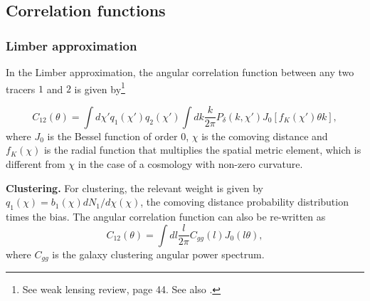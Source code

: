 \documentclass[\docopts]{\docclass}
\newcommand{\todo}[1]{\textcolor{magenta}{To do: #1}}
\newcommand{\mrm}[1]{\mathrm{#1}}
\begin{document}

\subsection{Correlation functions}
\label{sec:corr}

\subsubsection{Limber approximation}

In the Limber approximation, the angular correlation function between any two tracers $1$ and $2$ is given by\footnote{See \citet{Bartelmann01} weak lensing review, page 44. See also \citet{Joachimi10}.}

\begin{equation}
C_{12}(\theta) = \int d\chi'q_1(\chi')q_2(\chi')\int dk\frac{k}{2\pi}P_{\delta}(k,\chi')J_0[f_K(\chi')\theta k],
\end{equation}
%
where $J_0$ is the Bessel function of order 0, $\chi$ is the comoving distance and $f_K(\chi)$ is the radial function that multiplies the spatial metric element, which is different from $\chi$ in the case of a cosmology with non-zero curvature.

{\bf Clustering.} For clustering, the relevant weight is given by $q_1(\chi)=b_1(\chi)dN_1/d\chi(\chi)$, the comoving distance probability distribution times the bias. The angular correlation function can also be re-written as
\begin{equation}
C_{12}(\theta) = \int dl \frac{l}{2\pi} C_{gg}(l) J_0(l\theta),
\label{eq:xiclu}
\end{equation}
where $C_{gg}$ is the galaxy clustering angular power spectrum.
\end{document}
